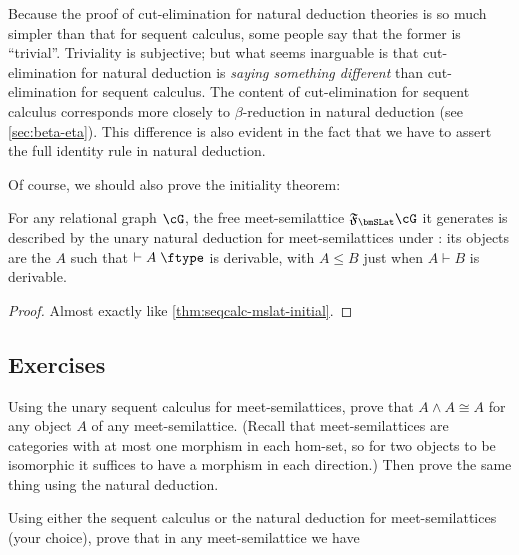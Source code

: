 \documentclass{book}
\let\types\vdash
\def\type{\;\ftype}
\newcommand{\F}[1]{\mathfrak{F}_{#1}}
\let\meet\wedge
\begin{document}
\begin{rmk}
  Because the proof of cut-elimination for natural deduction theories is so much simpler than that for sequent calculus, some people say that the former is ``trivial''.
  Triviality is subjective; but what seems inarguable is that cut-elimination for natural deduction is \emph{saying something different} than cut-elimination for sequent calculus.
  The content of cut-elimination for sequent calculus corresponds more closely to $\beta$-reduction in natural deduction (see \cref{sec:beta-eta}).
  This difference is also evident in the fact that we have to assert the full identity rule in natural deduction.
\end{rmk}

Of course, we should also prove the initiality theorem:

\begin{thm}\label{thm:natded-mslat-initial}
  For any relational graph $\cG$, the free meet-semilattice $\F\bmSLat \cG$ it generates is described by the unary natural deduction for meet-semilattices under \cG: its objects are the $A$ such that $\types A\type$ is derivable, with $A\le B$ just when $A\types B$ is derivable.
\end{thm}
\begin{proof}
  Almost exactly like \cref{thm:seqcalc-mslat-initial}.
\end{proof}

\subsection*{Exercises}

\begin{ex}\label{ex:mslat-idem}
  Using the unary sequent calculus for meet-semilattices, prove that $A\meet A \cong A$ for any object $A$ of any meet-semilattice.
  (Recall that meet-semilattices are categories with at most one morphism in each hom-set, so for two objects to be isomorphic it suffices to have a morphism in each direction.)
  Then prove the same thing using the natural deduction.
\end{ex}

\begin{ex}\label{ex:mslat-monoid}
  Using either the sequent calculus or the natural deduction for meet-semilattices (your choice), prove that in any meet-semilattice we have
\end{ex}
\end{document}
